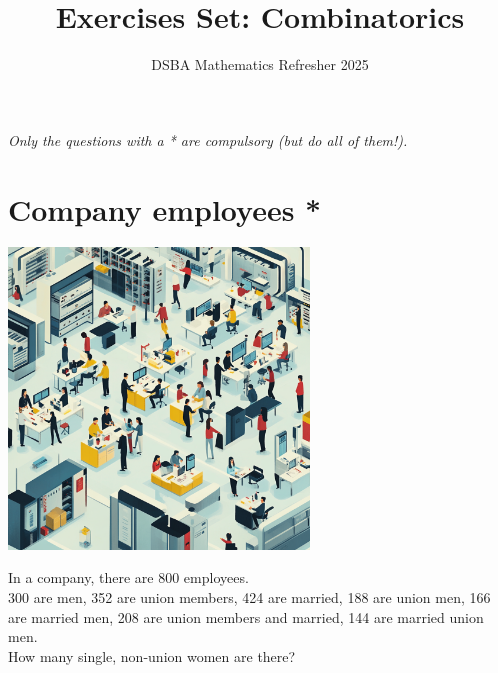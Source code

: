 \documentclass[]{article}
\title{Exercises Set: Combinatorics}
\author{DSBA Mathematics Refresher 2025}
\date{}
\begin{document}
	
	\maketitle
	
	\begin{center}
		\textit{Only the questions with a * are compulsory (but do all of them!).}
	\end{center}
	
	\section{Company employees *}
	\begin{center}
		\includegraphics[height=8cm]{company.png}
	\end{center}
	In a company, there are 800 employees.\\
	300 are men, 352 are union members, 424 are married, 188 are union men, 166 are married men, 208 are union members and married, 144 are married union men.\\
	How many single, non-union women are there?
	
	\newpage
\end{document}
